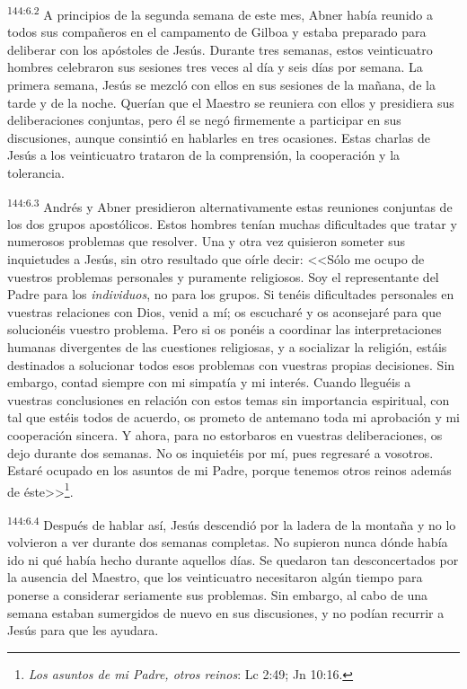 \par 
\textsuperscript{144:6.2} A principios de la segunda semana de este mes, Abner había reunido a todos sus compañeros en el campamento de Gilboa y estaba preparado para deliberar con los apóstoles de Jesús. Durante tres semanas, estos veinticuatro hombres celebraron sus sesiones tres veces al día y seis días por semana. La primera semana, Jesús se mezcló con ellos en sus sesiones de la mañana, de la tarde y de la noche. Querían que el Maestro se reuniera con ellos y presidiera sus deliberaciones conjuntas, pero él se negó firmemente a participar en sus discusiones, aunque consintió en hablarles en tres ocasiones. Estas charlas de Jesús a los veinticuatro trataron de la comprensión, la cooperación y la tolerancia.

\par 
\textsuperscript{144:6.3} Andrés y Abner presidieron alternativamente estas reuniones conjuntas de los dos grupos apostólicos. Estos hombres tenían muchas dificultades que tratar y numerosos problemas que resolver. Una y otra vez quisieron someter sus inquietudes a Jesús, sin otro resultado que oírle decir: <<Sólo me ocupo de vuestros problemas personales y puramente religiosos. Soy el representante del Padre para los \textit{individuos}, no para los grupos. Si tenéis dificultades personales en vuestras relaciones con Dios, venid a mí; os escucharé y os aconsejaré para que solucionéis vuestro problema. Pero si os ponéis a coordinar las interpretaciones humanas divergentes de las cuestiones religiosas, y a socializar la religión, estáis destinados a solucionar todos esos problemas con vuestras propias decisiones. Sin embargo, contad siempre con mi simpatía y mi interés. Cuando lleguéis a vuestras conclusiones en relación con estos temas sin importancia espiritual, con tal que estéis todos de acuerdo, os prometo de antemano toda mi aprobación y mi cooperación sincera. Y ahora, para no estorbaros en vuestras deliberaciones, os dejo durante dos semanas. No os inquietéis por mí, pues regresaré a vosotros. Estaré ocupado en los asuntos de mi Padre, porque tenemos otros reinos además de éste>>\footnote{\textit{Los asuntos de mi Padre, otros reinos}: Lc 2:49; Jn 10:16.}.

\par 
\textsuperscript{144:6.4} Después de hablar así, Jesús descendió por la ladera de la montaña y no lo volvieron a ver durante dos semanas completas. No supieron nunca dónde había ido ni qué había hecho durante aquellos días. Se quedaron tan desconcertados por la ausencia del Maestro, que los veinticuatro necesitaron algún tiempo para ponerse a considerar seriamente sus problemas. Sin embargo, al cabo de una semana estaban sumergidos de nuevo en sus discusiones, y no podían recurrir a Jesús para que les ayudara.

